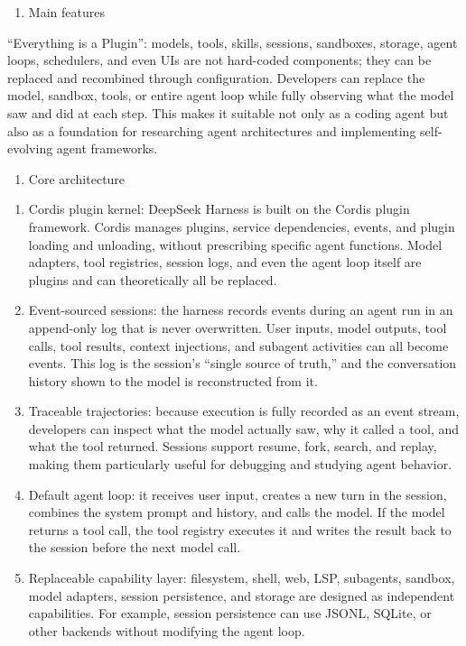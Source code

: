 \begin{enumerate}
\def\labelenumi{(\Roman{enumi})}
\tightlist
\item
  Main features
\end{enumerate}

``Everything is a Plugin'': models, tools, skills, sessions, sandboxes, storage, agent loops, schedulers, and even UIs are not hard-coded components; they can be replaced and recombined through configuration. Developers can replace the model, sandbox, tools, or entire agent loop while fully observing what the model saw and did at each step. This makes it suitable not only as a coding agent but also as a foundation for researching agent architectures and implementing self-evolving agent frameworks.

\begin{enumerate}
\def\labelenumi{(\Roman{enumi})}
\setcounter{enumi}{1}
\tightlist
\item
  Core architecture
\end{enumerate}

\begin{enumerate}
\def\labelenumi{\arabic{enumi}.}
\item
  Cordis plugin kernel: DeepSeek Harness is built on the Cordis plugin framework. Cordis manages plugins, service dependencies, events, and plugin loading and unloading, without prescribing specific agent functions. Model adapters, tool registries, session logs, and even the agent loop itself are plugins and can theoretically all be replaced.
\item
  Event-sourced sessions: the harness records events during an agent run in an append-only log that is never overwritten. User inputs, model outputs, tool calls, tool results, context injections, and subagent activities can all become events. This log is the session's ``single source of truth,'' and the conversation history shown to the model is reconstructed from it.
\item
  Traceable trajectories: because execution is fully recorded as an event stream, developers can inspect what the model actually saw, why it called a tool, and what the tool returned. Sessions support resume, fork, search, and replay, making them particularly useful for debugging and studying agent behavior.
\item
  Default agent loop: it receives user input, creates a new turn in the session, combines the system prompt and history, and calls the model. If the model returns a tool call, the tool registry executes it and writes the result back to the session before the next model call.
\item
  Replaceable capability layer: filesystem, shell, web, LSP, subagents, sandbox, model adapters, session persistence, and storage are designed as independent capabilities. For example, session persistence can use JSONL, SQLite, or other backends without modifying the agent loop.
\end{enumerate}

